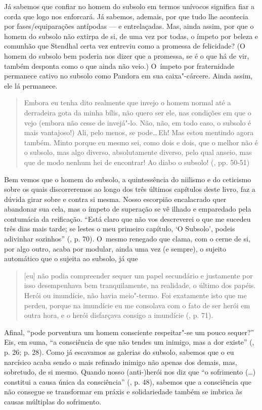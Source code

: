Já sabemos que confiar no homem do subsolo em termos unívocos significa
fiar a corda que logo nos enforcará. Já sabemos, ademais, por que tudo
lhe acontecia por fases/equiparações antípodas --- e entrelaçadas. Mas,
ainda assim, por que o homem do subsolo não extirpa de si, de uma vez
por todas, o ímpeto por beleza e comunhão que Stendhal certa vez
entreviu como a promessa de felicidade? (O homem do subsolo bem poderia
nos dizer que a promessa, se é o que há de vir, também desponta como o
que ainda não veio.) O~ímpeto por fraternidade permanece cativo no
subsolo como Pandora em sua caixa"-cárcere. Ainda assim, ele lá
permanece.

\begin{quote}
Embora eu tenha dito realmente que invejo o homem normal até a
derradeira gota da minha bílis, não quero ser ele, nas condições em que
o vejo (embora não cesse de invejá"-lo. Não, não, em todo caso, o subsolo
é mais vantajoso!) Ali, pelo menos, se pode\ldots \,Eh! Mas estou mentindo
agora também. Minto porque eu mesmo sei, como dois e dois, que o melhor
não é o subsolo, mas algo diverso, absolutamente diverso, pelo qual
anseio, mas que de modo nenhum hei de encontrar! Ao diabo o subsolo!
(, pp. 50-51)
\end{quote}

Bem vemos que o homem do subsolo, a quintessência do niilismo e do
ceticismo sobre os quais discorreremos ao longo dos três últimos
capítulos deste livro, faz a dúvida girar sobre e contra si mesma. Nosso
escorpião encalacrado quer abandonar sua cela, mas o ímpeto de superação
se vê ilhado e emparedado pela contumácia da reificação. ``Está claro
que não vos descreverei o que me sucedeu três dias mais tarde; se lestes
o meu primeiro capítulo, `O Subsolo', podeis adivinhar sozinhos'' (,
p. 70). O~mesmo renegado que clama, com o cerne de si, por algo outro,
acaba por modular, ainda uma vez (e sempre), o sujeito automático que o
sujeita ao subsolo, já que

\begin{quote}
{[}eu{]} não podia compreender sequer um papel secundário e justamente
por isso desempenhava bem tranquilamente, na realidade, o último dos
papéis. Herói ou imundície, não havia meio"-termo. Foi exatamente isto
que me perdeu, porque na imundície eu me consolava com o fato de ser
herói em outra hora, e o herói disfarçava consigo a imundície (, p.
71).
\end{quote}

Afinal, ``pode porventura um homem consciente respeitar"-se um pouco
sequer?'' Eis, em suma, ``a consciência de que não tendes um inimigo,
mas a dor existe'' (, p. 26; p. 28). Como já escavamos as galerias
do subsolo, sabemos que o eu narcísico acaba sendo o mais refinado
inimigo não apenas dos demais, mas, sobretudo, de si mesmo. Quando nosso
\mbox{(anti-)herói} nos diz que ``o sofrimento (\ldots) constitui a causa única da
consciência'' (, p. 48), sabemos que a consciência que não consegue
se transformar em práxis e solidariedade também se imbrica às causas
múltiplas do sofrimento.

